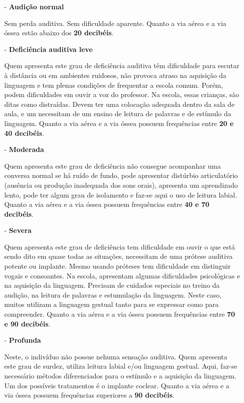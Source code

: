\documentclass[brasil]{abnt}
\begin{document}
				\begin{itemize}		
					\item [-] \textbf{Audição normal}
					
					Sem perda auditiva. Sem dificuldade aparente. Quanto a via aérea e a via óssea estão abaixo dos \textbf{20 decibéis}. 
					
					\item [-] \textbf{Deficiência auditiva leve} 
					
					Quem apresenta este grau de deficiência auditiva têm dificuldade para escutar à distância ou em ambientes ruidosos, 
					não provoca atraso na aquisição da linguagem e tem plenas condições de frequentar a escola comum. Porém, podem dificuldades 
					em ouvir a voz do professor. Na escola, essas crianças, são ditas como distraídas.
					Devem ter uma colocação adequada dentro da sala de aula, e um necessitam de um ensino de leitura de palavras e de estímulo 
					da linguagem. Quanto a via aérea e a via óssea possuem frequências entre \textbf{20 e 40 decibéis}.
										
					\item [-] \textbf{Moderada} 
					
					Quem apresenta este grau de deficiência não consegue acompanhar uma conversa normal se há ruído de fundo, pode apresentar 
					distúrbio articulatório (ausência ou produção inadequada dos sons orais), apresenta um aprendizado lento, pode ter algum grau de 
					isolamento e faz-se aqui o uso de leitura labial. Quanto a via aérea e a via óssea possuem frequências entre \textbf{40 e 70 decibéis}.
					
					\item [-] \textbf{Severa}
					
					Quem apresenta este grau de deficiência tem dificuldade em ouvir o que está sendo dito em quase todas as situações, necessitam 
					de uma prótese auditiva potente ou implante. Mesmo usando próteses tem dificuldade em distinguir vogais e consoantes. Na escola, apresentam
					algumas dificuldades psicológicas e na aquisição da linguagem. Precisam de cuidados especiais no treino da audição, na leitura de palavras e 
					estumulação da linguagem. Neste caso, muitos utilizam a linguagem gestual tanto para se expressar como para compreender. Quanto a via aérea 
					e a via óssea possuem frequências entre \textbf{70 e 90 decibéis}.
					
					\item [-] \textbf{Profunda}
					
					Neste, o indivíduo não possue nehuma sensação auditiva. Quem apresenta este grau de surdez, utiliza leitura labial e/ou linguagem gestual.
					Aqui, faz-se necessário métodos diferenciados para o estímulo e a aquisição da linguagem. Um dos possíveis tratamentos é o implante coclear.
					Quanto a via aérea e a via óssea possuem frequências superiores a \textbf{90 decibéis}.
					
				\end{itemize}
	
\end{document}
